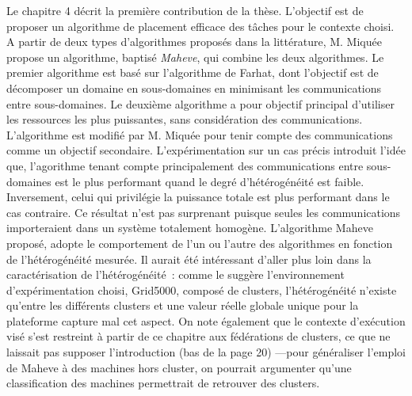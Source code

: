 \documentclass[a4paper,12pt]{article}
\begin{document}
Le chapitre 4 décrit la première contribution de la thèse. L'objectif
est de proposer un algorithme de placement efficace des tâches pour le
contexte choisi. A partir de deux types d'algorithmes proposés dans la 
littérature, M. Miquée propose un algorithme, baptisé \textit{Maheve}, 
qui combine les deux algorithmes. Le premier algorithme est basé sur 
l'algorithme de Farhat, dont l'objectif est de décomposer un domaine en 
sous-domaines en minimisant les communications entre sous-domaines. Le 
deuxième algorithme a pour objectif principal d'utiliser les ressources 
les plus puissantes, sans considération des communications. L'algorithme
est modifié par M. Miquée pour tenir compte des communications comme
un objectif secondaire. L'expérimentation sur un cas précis introduit
l'idée que, l'agorithme tenant compte principalement des communications
entre sous-domaines est le plus performant quand le degré d'hétérogénéité
est faible. Inversement, celui qui privilégie la puissance totale est plus
performant dans le cas contraire. Ce résultat n'est pas surprenant puisque 
seules les communications importeraient dans un système totalement homogène. 
L'algorithme Maheve proposé, adopte le comportement de l'un ou l'autre des 
algorithmes en fonction de l'hétérogénéité mesurée.
Il aurait été intéressant d'aller plus loin dans la caractérisation
de l'hétérogénéité~: comme le suggère l'environnement d'expérimentation
choisi, Grid5000, composé de clusters, l'hétérogénéité n'existe qu'entre 
les différents clusters et une valeur réelle globale unique pour 
la plateforme capture mal cet aspect. On note également que le contexte 
d'exécution visé s'est restreint à partir de ce chapitre aux fédérations de 
clusters, ce que ne laissait pas supposer l'introduction (bas de la page 20) 
---pour généraliser l'emploi de Maheve à des machines hors cluster, 
on pourrait argumenter qu'une classification des machines permettrait de 
retrouver des clusters.
\end{document}
